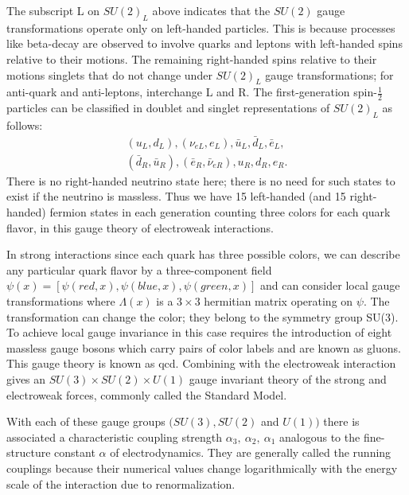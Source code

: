 The subscript L on $SU(2)_L$ above indicates that the $SU(2)$ gauge transformations operate only on left-handed particles. This is because processes like beta-decay are observed to involve quarks and leptons with left-handed spins relative to their motions. The remaining right-handed spins relative to their motions singlets that do not change under $SU(2)_L$ gauge transformations; for anti-quark and anti-leptons, interchange L and R. The first-generation spin-$\frac{1}{2}$ particles can be classified in doublet and singlet representations of $SU(2)_L$ as follows:
	\begin{eqnarray}
	(u_L,d_L),(\nu_{eL},e_L),\bar{u}_L,\bar{d}_L,\bar{e}_L,	\nonumber \\
	(\bar{d}_R,\bar{u}_R),(\bar{e}_R,\bar{\nu}_{eR}),u_R,d_R,e_R.	\nonumber
	\end{eqnarray}
There is no right-handed neutrino state here; there is no need for such states to exist if the neutrino is massless. Thus we have 15 left-handed (and 15 right-handed) fermion states in each generation counting three colors for each quark flavor, in this gauge theory of electroweak interactions.


In strong interactions since each quark has three possible colors, we can describe any particular quark flavor by a three-component field $\psi(x)=[\psi(red,x),\psi(blue,x),\psi(green,x)]$ and can consider local gauge transformations where $\Lambda(x)$ is a $3\times 3$ hermitian matrix operating on $\psi$. The transformation can change the color; they belong to the symmetry group SU(3). To achieve local gauge invariance in this case requires the introduction of eight massless gauge bosons which carry pairs of color labels and are known as gluons. This gauge theory is known as {qcd}. Combining with the electroweak interaction gives an $SU(3)\times SU(2) \times U(1)$ gauge invariant theory of the strong and electroweak forces, commonly called the Standard Model.

With each of these gauge groups $(SU(3),SU(2)$ and $U(1))$ there is associated a characteristic coupling strength $\alpha_3,~\alpha_2,~\alpha_1$ analogous to the fine-structure constant $\alpha$ of electrodynamics. They are generally called the running couplings because their numerical values change logarithmically with the energy scale of the interaction due to renormalization.

